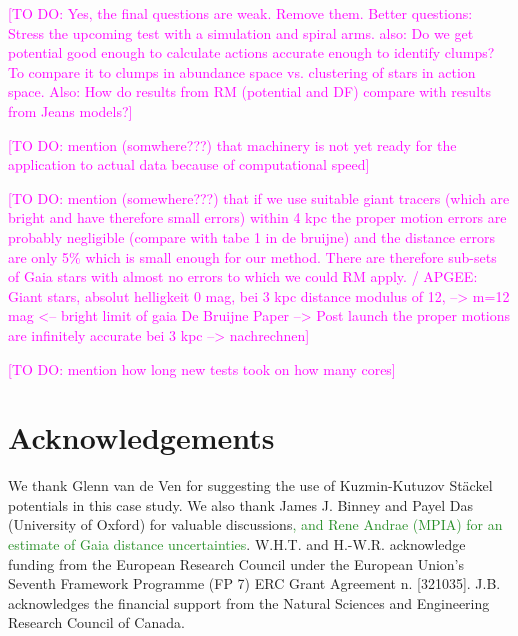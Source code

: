 \documentclass[iop,revtex4]{emulateapj}
\newcommand{\NEW}[1]{\textcolor{ForestGreen}{#1}}
\newcommand{\Wilma}[1]{\textcolor{Magenta}{#1}}
\begin{document}
\Wilma{[TO DO: Yes, the final questions are weak. Remove them. Better questions: Stress the upcoming test with a simulation and spiral arms. also: Do we get potential good enough to calculate actions accurate enough to identify clumps? To compare it to clumps in abundance space vs. clustering of stars in action space. Also: How do results from RM (potential and DF) compare with results from Jeans models?]}

\Wilma{[TO DO: mention (somwhere???) that machinery is not yet ready for the application to actual data because of computational speed]}

\Wilma{[TO DO: mention (somewhere???) that if we use suitable giant tracers (which are bright and have therefore small errors) within 4 kpc the proper motion errors are probably negligible (compare with tabe 1 in de bruijne) and the distance errors are only 5\% which is small enough for our method. There are therefore sub-sets of Gaia stars with almost no errors to which we could RM apply. / APGEE: Giant stars, absolut helligkeit 0 mag, bei 3 kpc distance modulus
of 12, --> m=12 mag <-- bright limit of gaia
De Bruijne Paper --> Post launch
the proper motions are infinitely accurate bei 3 kpc --> nachrechnen]}

\Wilma{[TO DO: mention how long new tests took on how many cores]}

\section{Acknowledgements}

We thank Glenn van de Ven for suggesting the use of Kuzmin-Kutuzov St\"{a}ckel potentials in this case study. We also thank James J. Binney and Payel Das (University of Oxford) for valuable discussions\NEW{, and Rene Andrae (MPIA) for an estimate of Gaia distance uncertainties}. W.H.T. and H.-W.R. acknowledge funding from the European  Research Council under the European Union's Seventh Framework Programme (FP 7) ERC Grant Agreement n. [321035]. J.B. acknowledges the financial support from the Natural Sciences and Engineering Research Council of Canada. 
\end{document}
